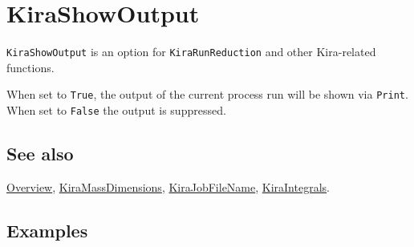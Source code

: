 \documentclass[../FeynHelpersManual.tex]{subfiles}
\begin{document}
\begin{Shaded}
\begin{Highlighting}[]
 
\end{Highlighting}
\end{Shaded}

\hypertarget{kirashowoutput}{
\section{KiraShowOutput}\label{kirashowoutput}}

\texttt{KiraShowOutput} is an option for \texttt{KiraRunReduction} and
other Kira-related functions.

When set to \texttt{True}, the output of the current process run will be
shown via \texttt{Print}. When set to \texttt{False} the output is
suppressed.

\subsection{See also}

\hyperlink{toc}{Overview},
\hyperlink{kiramassdimensions}{KiraMassDimensions},
\hyperlink{kirajobfilename}{KiraJobFileName},
\hyperlink{kiraintegrals}{KiraIntegrals}.

\subsection{Examples}
\end{document}
